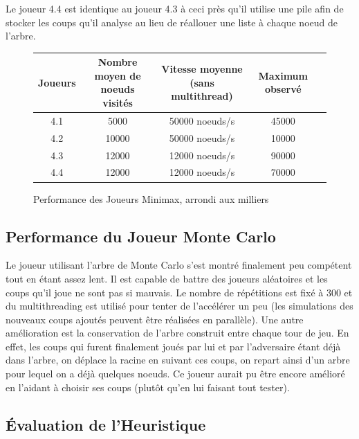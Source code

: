 \documentclass[a4paper,11pt]{article}
\begin{document}
Le joueur 4.4 est identique au joueur 4.3 à ceci près qu'il utilise une pile afin de stocker les coups qu'il analyse au lieu de réallouer une liste à chaque noeud de l'arbre.


\begin{figure}[h]
    \centering
    \caption{Performance des Joueurs Minimax, arrondi aux milliers}
    \label{tab3}
    \begin{tabular}{|c|c|c|c|c|}
    \hline
        Joueurs & Nombre moyen de noeuds visités & Vitesse moyenne (sans multithread) & Maximum observé\\
        \hline
         4.1 & 5000 & 50000 noeuds/s & 45000 \\
        \hline
        4.2 & 10000 & 50000 noeuds/s & 10000 \\
        \hline
        4.3 & 12000 & 12000 noeuds/s & 90000 \\
        \hline
        4.4 & 12000 & 12000 noeuds/s & 70000\\
        \hline
    \end{tabular}
\end{figure}

\subsection{Performance du Joueur Monte Carlo}

Le joueur utilisant l'arbre de Monte Carlo s'est montré finalement peu compétent tout en étant assez lent. Il est capable de battre des joueurs aléatoires et les coups qu'il joue ne sont pas si mauvais. Le nombre de répétitions est fixé à 300 et du multithreading est utilisé pour tenter de l'accélérer un peu (les simulations des nouveaux coups ajoutés peuvent être réalisées en parallèle). Une autre amélioration est la conservation de l'arbre construit entre chaque tour de jeu. En effet, les coups qui furent finalement joués par lui et par l'adversaire étant déjà dans l'arbre, on déplace la racine en suivant ces coups, on repart ainsi d'un arbre pour lequel on a déjà quelques noeuds. Ce joueur aurait pu être encore amélioré en l'aidant à choisir ses coups (plutôt qu'en lui faisant tout tester).

\subsection{Évaluation de l'Heuristique}
\label{evalheur}
\end{document}

